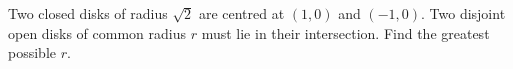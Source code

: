 Two closed disks of radius $\sqrt2 $ are centred at $(1,0)$ and $(-1,0)$. Two disjoint open disks of common radius $ r $ must lie in their intersection. Find the greatest possible $ r $.
